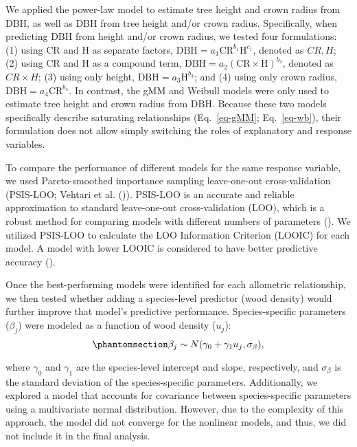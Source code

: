 \documentclass[
  12pt,
  letterpaper,
  DIV=11,
  numbers=noendperiod]{scrartcl}
\begin{document}
We applied the power-law model to estimate tree height and crown radius
from DBH, as well as DBH from tree height and/or crown radius.
Specifically, when predicting DBH from height and/or crown radius, we
tested four formulations: (1) using CR and H as separate factors,
\(\mathrm{DBH} = a_1 \mathrm{CR}^{b_1} \mathrm{H}^{c_1}\), denoted as
\(CR,H\); (2) using CR and H as a compound term,
\(\mathrm{DBH} = a_2 (\mathrm{CR} \times \mathrm{H})^{b_2}\), denoted as
\(CR \times H\); (3) using only height,
\(\mathrm{DBH} = a_3 \mathrm{H}^{b_3}\); and (4) using only crown
radius, \(\mathrm{DBH} = a_4 \mathrm{CR}^{b_4}\). In contrast, the gMM
and Weibull models were only used to estimate tree height and crown
radius from DBH. Because these two models specifically describe
saturating relationships (Eq.~\ref{eq-gMM}; Eq.~\ref{eq-wb}), their
formulation does not allow simply switching the roles of explanatory and
response variables.

To compare the performance of different models for the same response
variable, we used Pareto-smoothed importance sampling leave-one-out
cross-validation (PSIS-LOO; Vehtari et al.
()). PSIS-LOO is an accurate and
reliable approximation to standard leave-one-out cross-validation (LOO),
which is a robust method for comparing models with different numbers of
parameters (). We
utilized PSIS-LOO to calculate the LOO Information Criterion (LOOIC) for
each model. A model with lower LOOIC is considered to have better
predictive accuracy ().

Once the best-performing models were identified for each allometric
relationship, we then tested whether adding a species-level predictor
(wood density) would further improve that model's predictive
performance. Species-specific parameters (\(\beta_j\)) were modeled as a
function of wood density (\(u_j\)):
\begin{equation}\phantomsection\label{eq-wood}{
\beta_{j} \sim N(\gamma_{0} + \gamma_{1} u_j, \sigma_{\beta}),
}\end{equation}

where \(\gamma_{0}\) and \(\gamma_{1}\) are the species-level intercept
and slope, respectively, and \(\sigma_{\beta}\) is the standard
deviation of the species-specific parameters. Additionally, we explored
a model that accounts for covariance between species-specific parameters
using a multivariate normal distribution. However, due to the complexity
of this approach, the model did not converge for the nonlinear models,
and thus, we did not include it in the final analysis.
\end{document}
